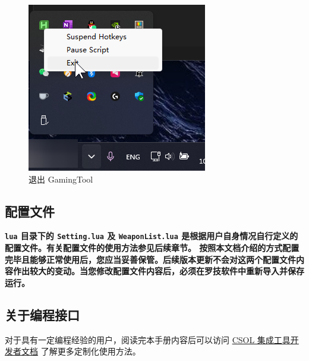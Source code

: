 \begin{figure}[H]
    \Centering
    \includegraphics[width=\textwidth]{assets/intro/exit_gamingtool}
    \caption{退出 GamingTool}
\end{figure}

\subsection{配置文件}

\textbf{\color{red}\lstinline{lua} 目录下的 \lstinline{Setting.lua} 及 \lstinline{WeaponList.lua} 是根据用户自身情况自行定义的配置文件。有关配置文件的使用方法参见后续章节。
按照本文档介绍的方式配置完毕且能够正常使用后，您应当妥善保管。后续版本更新不会对这两个配置文件内容作出较大的变动。当您修改配置文件内容后，必须在罗技软件中重新导入并保存运行。}

\subsection{关于编程接口}

对于具有一定编程经验的用户，阅读完本手册内容后可以访问 \href{https://blog.macrohard.fun/CSOL-Utilities/}{CSOL 集成工具开发者文档} 了解更多定制化使用方法。
